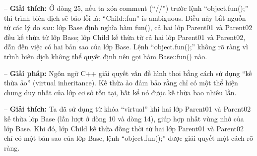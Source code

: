 -- \textbf{Giải thích:} Ở dòng 25, nếu ta xóa comment (“//”) trước lệnh “object.fun();” thì trình biên dịch sẽ 
báo lỗi là: “Child::fun” is ambiguous. Điều này bắt nguồn từ các lý do sau: lớp Base định nghĩa hàm fun(), 
cả hai lớp Parent01 và Parent02 đều kế thừa từ lớp Base; lớp Child kế thừa từ cả hai lớp Parent01 và Parent02, 
dẫn đến việc có hai bản sao của lớp Base. Lệnh “object.fun();” không rõ ràng vì trình biên dịch không thể quyết định 
nên gọi hàm Base::fun() nào.

-- \textbf{Giải pháp:} Ngôn ngữ C++ giải quyết vấn đề hình thoi bằng cách sử dụng “kế thừa ảo” (virtual inheritance). 
Kế thừa ảo đảm bảo rằng chỉ có một thể hiện chung duy nhất của lớp cơ sở tồn tại, bất kể nó được kế thừa bao nhiêu lần.


-- \textbf{Giải thích:} Ta đã sử dụng từ khóa “virtual” khi hai lớp Parent01 và Parent02 kế thừa lớp Base (lần lượt ở dòng 10 và dòng 14), 
giúp hợp nhất vùng nhớ của lớp Base. Khi đó, lớp Child kế thừa đồng thời từ hai lớp Parent01 và Parent02 chỉ có một bản sao của lớp Base, 
lệnh “object.fun();” được giải quyết một cách rõ ràng.
